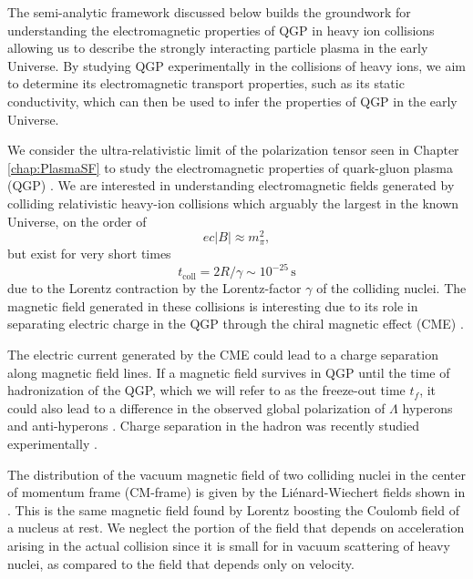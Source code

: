 {\color{blue} The semi-analytic framework discussed below builds the groundwork for understanding the electromagnetic properties of QGP in heavy ion collisions allowing us to describe the strongly interacting particle plasma in the early Universe. By studying QGP experimentally in the collisions of heavy ions, we aim to determine its electromagnetic transport properties, such as its static conductivity, which can then be used to infer the properties of QGP in the early Universe.}

We consider the ultra-relativistic limit of the polarization tensor seen in Chapter \ref{chap:PlasmaSF} to study the electromagnetic properties of quark-gluon plasma (QGP) \cite{Grayson:2022asf}. We are interested in understanding  electromagnetic fields generated by colliding relativistic heavy-ion collisions which arguably  the largest in the known Universe, on the order of 
\begin{equation}\label{eq:Bcol}
ec|B| \approx m_\pi^2,
\end{equation}
but exist for very short times 
\begin{equation}\label{eq:tcol}
t_{\text{coll}}= 2 R/\gamma \sim 10^{-25}\,\textrm{s}
\end{equation}
due to the Lorentz contraction by the Lorentz-factor $\gamma$ of the colliding nuclei. The magnetic field generated in these collisions is interesting due to its role in separating electric charge in the QGP through the chiral magnetic effect (CME) \cite{Kharzeev:2007jp}.

The electric current generated by the CME could lead to a charge separation along magnetic field lines. If a magnetic field survives in QGP until the time of hadronization of the QGP, which we will refer to as the freeze-out time $t_f$, it could also lead to a difference in the observed global polarization of $\Lambda$ hyperons and anti-hyperons \cite{Muller:2018ibh}. Charge separation in the hadron was recently studied experimentally \cite{STAR:2023jdd}. 

The distribution of the vacuum magnetic field of two colliding nuclei in the center of momentum frame (CM-frame) is given by the Li\'enard-Wiechert fields shown in . This is the same magnetic field found by Lorentz boosting the Coulomb field of a nucleus at rest. We neglect the portion of the field that depends on acceleration arising in the actual collision since it is small for in vacuum scattering of heavy nuclei, as compared to the field that depends only on velocity.

